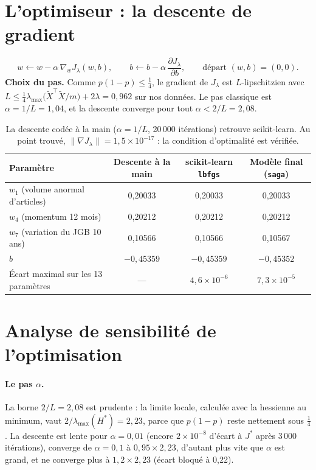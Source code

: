 \documentclass[11pt,a4paper]{article}
\begin{document}
\section{L'optimiseur : la descente de gradient}

\[
w\leftarrow w-\alpha\,\nabla_wJ_\lambda(w,b),\qquad b\leftarrow b-\alpha\,\frac{\partial J_\lambda}{\partial b},\qquad\text{départ } (w,b)=(0,0).
\]
\textbf{Choix du pas.} Comme $p(1-p)\le\frac14$, le gradient de $J_\lambda$ est $L$-lipschitzien avec
$L\le\frac14\lambda_{\max}\big(\tilde X^\top\tilde X/m\big)+2\lambda=0{,}962$ sur nos données. Le pas classique est
$\alpha=1/L=1{,}04$, et la descente converge pour tout $\alpha<2/L=2{,}08$.

\begin{table}[H]\centering\small
\begin{tabular}{lccc}\toprule
Paramètre & Descente à la main & scikit-learn \texttt{lbfgs} & Modèle final (\texttt{saga}) \\\midrule
$w_1$ (volume anormal d'articles) & 0,20033 & 0,20033 & 0,20033 \\
$w_4$ (momentum 12 mois) & 0,20212 & 0,20212 & 0,20212 \\
$w_7$ (variation du JGB 10 ans) & 0,10566 & 0,10566 & 0,10567 \\
$b$ & $-0{,}45359$ & $-0{,}45359$ & $-0{,}45352$ \\\midrule
Écart maximal sur les 13 paramètres & --- & $4{,}6\times10^{-6}$ & $7{,}3\times10^{-5}$ \\\bottomrule
\end{tabular}
\caption{La descente codée à la main ($\alpha=1/L$, 20\,000 itérations) retrouve scikit-learn. Au point trouvé, $\lVert\nabla J_\lambda\rVert=1{,}5\times10^{-17}$ :
la condition d'optimalité est vérifiée.}
\end{table}

\section{Analyse de sensibilité de l'optimisation}

\paragraph{Le pas $\alpha$.} La borne $2/L=2{,}08$ est prudente : la limite locale, calculée avec la hessienne au
minimum, vaut $2/\lambda_{\max}(H^\ast)=2{,}23$, parce que $p(1-p)$ reste nettement sous $\frac14$. La descente est
lente pour $\alpha=0{,}01$ (encore $2\times10^{-8}$ d'écart à $J^\ast$ après 3\,000 itérations), converge de
$\alpha=0{,}1$ à $0{,}95\times2{,}23$, d'autant plus vite que $\alpha$ est grand, et ne converge plus à
$1{,}2\times2{,}23$ (écart bloqué à 0,22).
\end{document}
